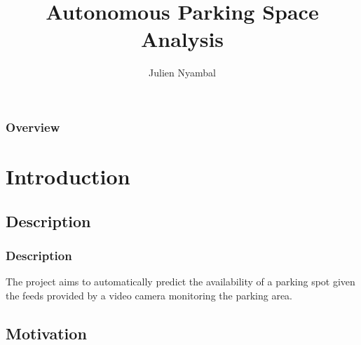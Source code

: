 \documentclass{beamer}
\title[Autononous Parking Space Analysis]{Autonomous Parking Space Analysis} %
\author{Julien Nyambal} %
\institute[WITS] %
{
University of the Witwatersrand, Johannesburg \\ %
\medskip
}
\date[\today]{} %
\begin{document}
\begin{frame}
\titlepage %
\end{frame}

\begin{frame}
\frametitle{Overview} %
\tableofcontents %
\end{frame}


\section{Introduction} %

\subsection{Description}

\begin{frame}
\frametitle{Description}

The project aims to automatically predict the availability of a parking spot given the feeds provided by a video camera monitoring the parking area. 

\end{frame}

\subsection{Motivation}
\end{document}
